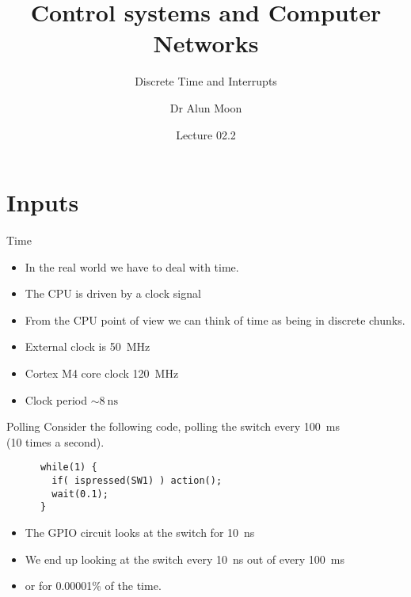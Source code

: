 \documentclass[xcolor=svgnames]{beamer}
\title{Control systems and Computer Networks}
\subtitle{Discrete Time and Interrupts}
\author{Dr Alun Moon}
\date{Lecture 02.2}
\begin{document}
\frame{\maketitle}

\part{Inputs}
\frame\partpage

\begin{frame}{Time}
\begin{itemize}
  \item In the real world we have to deal with time.
  \item The CPU is driven by a clock signal\\
  \item From the CPU point of view we can think of time as being
      in discrete chunks.
  \item External clock is \SI{50}{\mega\hertz}
  \item Cortex M4 core clock \SI{120}{\mega\hertz}
  \item Clock period $\sim\SI{8}{\nano\second}$
\end{itemize}
\end{frame}

\begin{frame}[fragile]{Polling}
  Consider the following code, polling the switch every \SI{100}{\milli\second}\\
  (10 times a second).
  \begin{exampleblock}{}
  \begin{verbatim}
      while(1) {
        if( ispressed(SW1) ) action();
        wait(0.1);
      }
  \end{verbatim}
\end{exampleblock}
\begin{itemize}
  \item The GPIO circuit looks at the switch for \SI{10}{ns}
  \item We end up looking at the switch every \SI{10}{ns} out of every \SI{100}{ms}
  \item \alert{or} for 0.00001\% of the time.
\end{itemize}
\end{frame}
\end{document}
